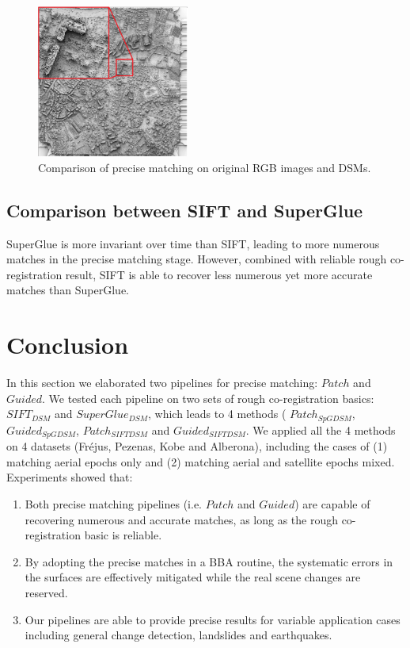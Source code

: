 \begin{figure}[htbp]
\begin{center}
{\begin{minipage}[t]{0.38\linewidth}
				\centering
				\includegraphics[width=5cm]{images/appendix4/DepthShade.png}
			\end{minipage}%
		}
		\caption{Comparison of precise matching on original RGB images and DSMs.}
		\label{precisematchingdepth}
	\end{center}
\end{figure} 

\subsection{Comparison between SIFT and SuperGlue}
SuperGlue is more invariant over time than SIFT, leading to more numerous matches in the precise matching stage. However, combined with reliable rough co-registration result, SIFT is able to recover less numerous yet more accurate matches than SuperGlue.

\section{Conclusion}
In this section we elaborated two pipelines for precise matching: $Patch$ and $Guided$. 
We tested each pipeline on two sets of rough co-registration basics: $SIFT_{DSM}$ and $SuperGlue_{DSM}$, which leads to 4 methods ( $Patch_{SpGDSM}$,  $Guided_{SpGDSM}$,  $Patch_{SIFTDSM}$ and  $Guided_{SIFTDSM}$.
We applied all the 4 methods on 4 datasets (Fr{\'e}jus, Pezenas, Kobe and Alberona), including the cases of (1) matching aerial epochs only and (2) matching aerial and satellite epochs mixed.
Experiments showed that:\\
\begin{enumerate}
	\item Both precise matching pipelines (i.e. $Patch$ and $Guided$) are capable of recovering numerous and accurate matches, as long as the rough co-registration basic is reliable.\\
	\item By adopting the precise matches in a \ac{BBA} routine, the systematic errors in the surfaces are effectively mitigated while the real scene changes are reserved.
	\item Our pipelines are able to provide precise results for variable application cases including general change detection, landslides and earthquakes.
\end{enumerate}

